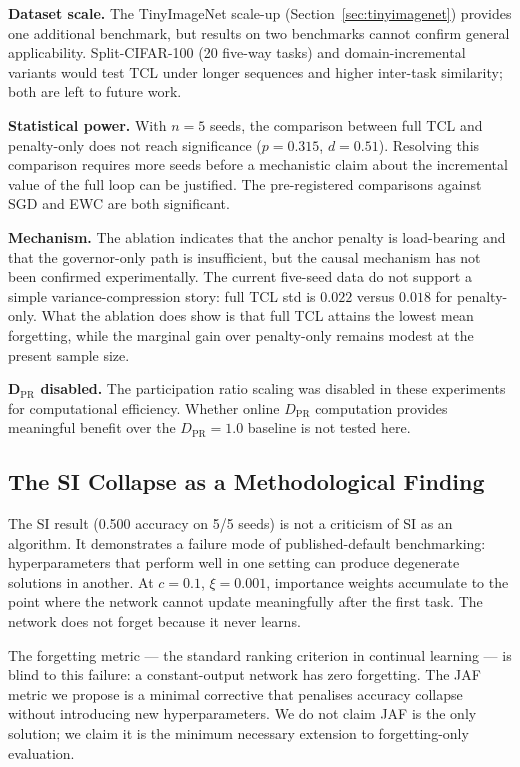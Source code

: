 \documentclass[10pt,a4paper]{article}
\begin{document}
\textbf{Dataset scale.}
The TinyImageNet scale-up (Section~\ref{sec:tinyimagenet}) provides one additional
benchmark, but results on two benchmarks cannot confirm general applicability.
Split-CIFAR-100 (20 five-way tasks) and domain-incremental variants would test TCL
under longer sequences and higher inter-task similarity; both are left to future work.

\textbf{Statistical power.}
With $n = 5$ seeds, the comparison between full TCL and penalty-only does not reach
significance ($p = 0.315$, $d = 0.51$).
Resolving this comparison requires more seeds before a mechanistic claim about the
incremental value of the full loop can be justified.
The pre-registered comparisons against SGD and EWC are both significant.

\textbf{Mechanism.}
The ablation indicates that the anchor penalty is load-bearing and that the
governor-only path is insufficient, but the causal mechanism has not been
confirmed experimentally.
The current five-seed data do not support a simple variance-compression story:
full TCL std is $0.022$ versus $0.018$ for penalty-only. What the ablation does
show is that full TCL attains the lowest mean forgetting, while the marginal gain
over penalty-only remains modest at the present sample size.

\textbf{D$_{\mathrm{PR}}$ disabled.}
The participation ratio scaling was disabled in these experiments for computational
efficiency.
Whether online $D_{\mathrm{PR}}$ computation provides meaningful benefit over the
$D_{\mathrm{PR}} = 1.0$ baseline is not tested here.

\subsection{The SI Collapse as a Methodological Finding}

The SI result (0.500 accuracy on 5/5 seeds) is not a criticism of SI as an algorithm.
It demonstrates a failure mode of published-default benchmarking: hyperparameters that
perform well in one setting can produce degenerate solutions in another.
At $c = 0.1$, $\xi = 0.001$, importance weights accumulate to the point where the
network cannot update meaningfully after the first task.
The network does not forget because it never learns.

The forgetting metric --- the standard ranking criterion in continual learning ---
is blind to this failure: a constant-output network has zero forgetting.
The JAF metric we propose is a minimal corrective that penalises accuracy collapse
without introducing new hyperparameters.
We do not claim JAF is the only solution; we claim it is the minimum necessary
extension to forgetting-only evaluation.
\end{document}
